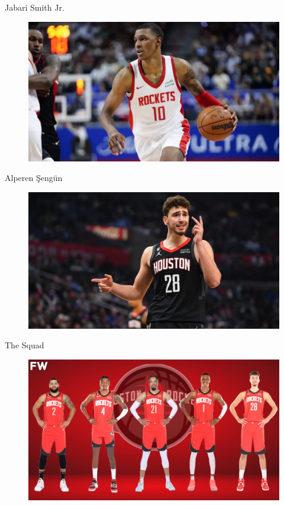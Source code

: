 \begin{frame}{Jabari Smith Jr.}
    \begin{figure}[h]
        \includegraphics[width=0.8\linewidth]{images/jabari.png}
        \label{fig:Team}
    \end{figure}
\end{frame}
\begin{frame}{Alperen Şengün}
    \begin{figure}[h]
        \includegraphics[width=0.8\linewidth]{images/alpy.png}
        \label{fig:Team}
    \end{figure}
\end{frame}

\begin{frame}{The Squad}
    \begin{figure}[h]
        \includegraphics[width=0.8\linewidth]{images/team.png}
        \label{fig:Team}
    \end{figure}
\end{frame}



\thanksframe
